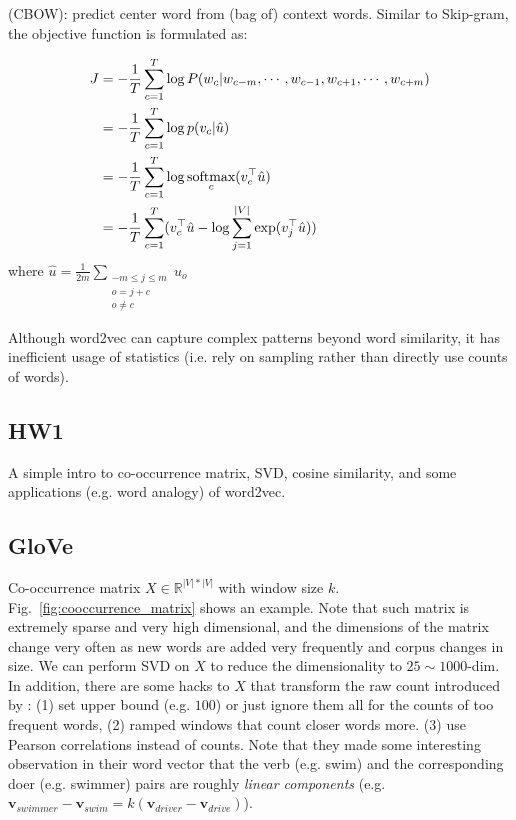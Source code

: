 
 (CBOW): predict center word from (bag of) context words.
Similar to Skip-gram, the objective function is formulated as:

\begin{align}
J &= -\frac{1}{T} \sum_{c=1}^{T} \log P (w_c | w_{c-m}, \cdots, w_{c-1}, w_{c+1}, \cdots, w_{c+m}) \\
&= -\frac{1}{T} \sum_{c=1}^{T} \log p (v_c | \hat{u}) \\
&= -\frac{1}{T} \sum_{c=1}^{T} \log \mathop{\textup{softmax}}\limits_{c}(v_c^\top \hat{u}) \\
&= -\frac{1}{T} \sum_{c=1}^{T} (v_c^\top \hat{u} - \log \sum_{j=1}^{|V|} \exp (v_j^\top \hat{u}))
\end{align}
where $\hat{u} = \frac{1}{2m} \sum_{ \substack{-m \le j \le m \\ o=j+c \\ o \ne c}} u_o$


Although word2vec can capture complex patterns beyond word similarity, it has inefficient usage of statistics (i.e. rely on sampling rather than directly use counts of words).

\subsection{HW1}

A simple intro to co-occurrence matrix, SVD, cosine similarity, and some applications (e.g. word analogy) of word2vec.

\subsection{GloVe}

Co-occurrence matrix $X \in \mathbb{R}^{|V| * |V|}$ with window size $k$.
Fig.~\ref{fig:cooccurrence_matrix} shows an example.
Note that such matrix is extremely sparse and very high dimensional, and the dimensions of the matrix change very often as new words are added very frequently and corpus changes in size.
We can perform SVD on $X$ to reduce the dimensionality to $25 \sim 1000$-dim.
In addition, there are some hacks to $X$ that transform the raw count introduced by : (1) set upper bound (e.g. $100$) or just ignore them all for the counts of too frequent words, (2) ramped windows that count closer words more. (3) use Pearson correlations instead of counts.
Note that they made some interesting observation in their word vector that the verb (e.g. swim) and the corresponding doer (e.g. swimmer) pairs are roughly \emph{linear components} (e.g. $\bm{v}_{swimmer} - \bm{v}_{swim} = k (\bm{v}_{driver} - \bm{v}_{drive})$).


